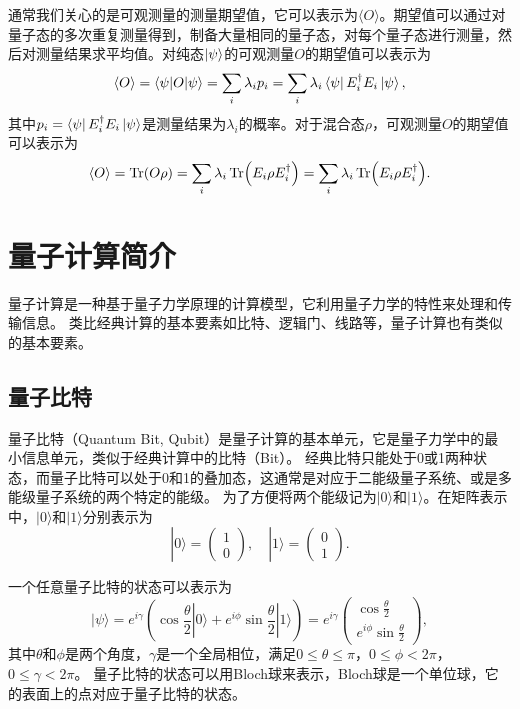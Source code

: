 通常我们关心的是可观测量的测量期望值，它可以表示为$\langle O \rangle$。期望值可以通过对量子态的多次重复测量得到，制备大量相同的量子态，对每个量子态进行测量，然后对测量结果求平均值。对纯态$\ket{\psi}$的可观测量$O$的期望值可以表示为
\begin{equation}
    \langle O \rangle = \langle \psi|O|\psi\rangle=\sum_i \lambda_i p_i=\sum_i \lambda_i \bra{\psi} E_i^\dagger E_i \ket{\psi},
\end{equation}
其中$p_i = \bra{\psi} E_i^\dagger E_i \ket{\psi}$是测量结果为$\lambda_i$的概率。对于混合态$\rho$，可观测量$O$的期望值可以表示为
\begin{equation}
    \langle O \rangle = \Tr(O\rho)=\sum_i \lambda_i \Tr(E_i\rho E_i^\dagger)=\sum_i \lambda_i \Tr(E_i\rho E_i^\dagger).
\end{equation}

\section{量子计算简介}

量子计算是一种基于量子力学原理的计算模型，它利用量子力学的特性来处理和传输信息。
类比经典计算的基本要素如比特、逻辑门、线路等，量子计算也有类似的基本要素。

\subsection{量子比特}
量子比特（Quantum Bit, Qubit）是量子计算的基本单元，它是量子力学中的最小信息单元，类似于经典计算中的比特（Bit）。
经典比特只能处于0或1两种状态，而量子比特可以处于0和1的叠加态，这通常是对应于二能级量子系统、或是多能级量子系统的两个特定的能级。
为了方便将两个能级记为$|0\rangle$和$|1\rangle$。在矩阵表示中，$|0\rangle$和$|1\rangle$分别表示为
\begin{equation}
    |0\rangle = \begin{pmatrix} 1 \\ 0 \end{pmatrix}, \quad |1\rangle = \begin{pmatrix} 0 \\ 1 \end{pmatrix}.
\end{equation}

一个任意量子比特的状态可以表示为
\begin{equation}
    |\psi\rangle = e^{i\gamma}(\cos\frac{\theta}{2}|0\rangle + e^{i\phi}\sin\frac{\theta}{2}|1\rangle)=e^{i\gamma}\begin{pmatrix}
        \cos\frac{\theta}{2} \\ e^{i\phi}\sin\frac{\theta}{2}
    \end{pmatrix},
\end{equation}
其中$\theta$和$\phi$是两个角度，$\gamma$是一个全局相位，满足$0 \leq \theta \leq \pi$，$0 \leq \phi < 2\pi$，$0 \leq \gamma < 2\pi$。 量子比特的状态可以用Bloch球来表示，Bloch球是一个单位球，它的表面上的点对应于量子比特的状态。

